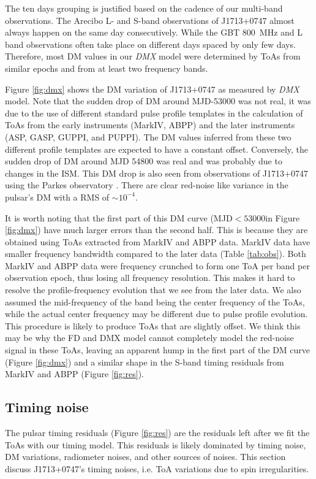 The ten days grouping is justified based on the cadence of our multi-band
observations.
The Arecibo L- and S-band observations of J1713+0747 almost always happen on
the same day consecutively.
While the GBT 800~MHz and L band observations often take place on different
days spaced by only few days.
Therefore, most DM values in our {\it DMX} model were determined by ToAs from
similar epochs and from at least two frequency bands. 

Figure \ref{fig:dmx} shows the DM variation of
J1713+0747 as measured by {\it DMX} model.
Note that the sudden drop of DM around MJD-53000 was not real, it was due to
the use of different standard pulse profile templates in the calculation of
ToAs from the early instruments (MarkIV, ABPP) and the later instruments
(ASP, GASP, GUPPI, and PUPPI). The DM values inferred from these two different
profile templates are expected to have a constant offset.
Conversely, the sudden drop of DM around MJD 54800 was real and was probably
due to changes in the ISM. This DM drop is also seen from observations of
J1713+0747 using the Parkes observatory \citep{kcs+13}.
There are clear red-noise like variance in the pulsar's DM with a RMS of
$\sim10^{-4}$. 

It is worth noting that the first part of this DM curve (MJD$<53000$in
Figure \ref{fig:dmx}) have much larger errors than the second half.
This is because they are obtained using ToAs extracted from
MarkIV and ABPP data. MarkIV data have smaller frequency bandwidth 
compared to the later data (Table \ref{tab:obs}).
Both MarkIV and ABPP data were frequency crunched to form one ToA per band per
observation epoch, thus losing all frequency resolution. This makes it hard to
resolve the profile-frequency evolution that we see from the later data. We
also assumed the mid-frequency of the band being the center frequency 
of the ToAs, while the actual center frequency may be different due to pulse
profile evolution. This procedure is likely to produce ToAs that are slightly offset. We think this may be why the FD and
DMX model cannot completely model the red-noise signal in these ToAs, leaving
an apparent hump in the first part of the DM curve (Figure \ref{fig:dmx}) and 
a similar shape in the S-band timing residuals from MarkIV and ABPP (Figure
\ref{fig:res}).


\subsection{Timing noise}
\label{sec:noise}
The pulsar timing residuals (Figure \ref{fig:res}) are the residuals left
after we fit the ToAs with our timing model. 
This residuals is likely dominated by timing noise, DM variations, radiometer 
noises, and other sources of noises. This section discuss J1713+0747's
timing noises, i.e. ToA variations due to spin irregularities.

